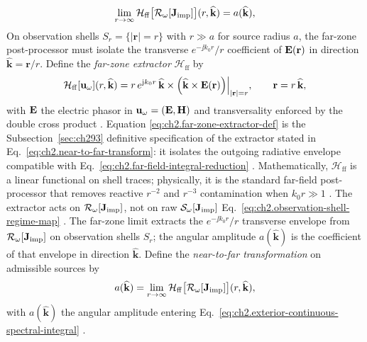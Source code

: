 \begin{equation}
\label{eq:ch2.near-to-far-integral-agreement}
\lim_{r\to\infty}
\mathcal{H}_{\mathrm{ff}}\big[\mathcal{R}_\omega[\mathbf{J}_{\mathrm{imp}}]\big](r,\widehat{\mathbf{k}})
=
a(\widehat{\mathbf{k}}),
\end{equation}
On observation shells \(S_r=\{|\mathbf{r}|=r\}\) with \(r\gg a\) for source radius \(a\), the
far-zone post-processor must isolate the transverse \(e^{-\jj k_0 r}/r\) coefficient of
\(\mathbf{E}(\mathbf{r})\) in direction \(\widehat{\mathbf{k}}=\mathbf{r}/r\). Define the
\emph{far-zone extractor} \(\mathcal{H}_{\mathrm{ff}}\) by
\begin{equation}
\label{eq:ch2.far-zone-extractor-def}
\mathcal{H}_{\mathrm{ff}}[\mathbf{u}_\omega](r,\widehat{\mathbf{k}})
=
r\,e^{\mathrm{j} k_0 r}\,
\widehat{\mathbf{k}}\times\Big(\widehat{\mathbf{k}}\times\mathbf{E}(\mathbf{r})\Big)\Big|_{|\mathbf{r}|=r},
\qquad
\mathbf{r}=r\,\widehat{\mathbf{k}},
\end{equation}
with \(\mathbf{E}\) the electric phasor in \(\mathbf{u}_\omega=(\mathbf{E},\mathbf{H})\) and transversality enforced by
the double cross product \cite{stratton1941}. Equation
\eqref{eq:ch2.far-zone-extractor-def} is the Subsection~\ref{sec:ch293} definitive specification of the
extractor stated in Eq.~\eqref{eq:ch2.near-to-far-transform}: it isolates the
outgoing radiative envelope compatible with Eq.~\eqref{eq:ch2.far-field-integral-reduction}
\cite{stratton1941}. Mathematically, \(\mathcal{H}_{\mathrm{ff}}\) is a linear functional on
shell traces; physically, it is the standard far-field post-processor that removes reactive
\(r^{-2}\) and \(r^{-3}\) contamination when \(k_0 r\gg 1\)
\cite{harrington2001}. The extractor acts on \(\mathcal{R}_\omega[\mathbf{J}_{\mathrm{imp}}]\), not on raw
\(\mathcal{S}_\omega[\mathbf{J}_{\mathrm{imp}}]\) Eq.~\eqref{eq:ch2.observation-shell-regime-map}
\cite{stratton1941}.
The far-zone limit extracts the \(e^{-\jj k_0 r}/r\) transverse envelope from
\(\mathcal{R}_\omega[\mathbf{J}_{\mathrm{imp}}]\) on observation shells \(S_r\); the angular amplitude
\(a(\widehat{\mathbf{k}})\) is the coefficient of that envelope in direction
\(\widehat{\mathbf{k}}\). Define the \emph{near-to-far transformation} on admissible sources by
\begin{equation}
\label{eq:ch2.near-to-far-transform-def}
a(\widehat{\mathbf{k}})
=
\lim_{r\to\infty}
\mathcal{H}_{\mathrm{ff}}\big[\mathcal{R}_\omega[\mathbf{J}_{\mathrm{imp}}]\big](r,\widehat{\mathbf{k}}),
\end{equation}
with \(a(\widehat{\mathbf{k}})\) the angular amplitude entering
Eq.~\eqref{eq:ch2.exterior-continuous-spectral-integral} \cite{stratton1941}.
